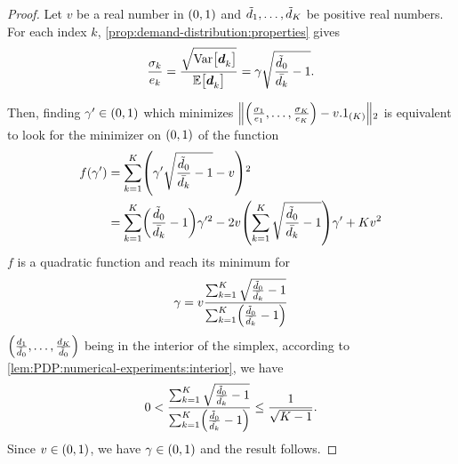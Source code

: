 \begin{proof}
Let $v$ be a real number in $\bracket{0,1}$ and $\tilde{d}_1,\ldots,\tilde{d}_K$ be positive real numbers.
For each index $k$, \cref{prop:demand-distribution:properties} gives
\begin{equation}
  \frac{\sigma_k}{e_k}
  = \frac{\sqrt{\vari\sqbracket{\va\demand_k}}}{\espe\sqbracket{\va\demand_k}}
  = \gamma\sqrt{\frac{\tilde{\demand}_0}{\bar{\demand_k}}-1}.
\end{equation}

Then, finding $\gamma'\in\bracket{0,1}$ which minimizes $\norm{\bracket{\frac{\sigma_1}{e_1},\ldots,\frac{\sigma_K}{e_K}}-v.1_{(K)}}_2$ is equivalent to look for the minimizer on $\bracket{0,1}$ of the function
\begin{subequations}
\begin{align}
  f\bracket{\gamma'}
  &= \sum_{k=1}^K \bracket{\gamma'\sqrt{\frac{\tilde{\demand}_0}{\bar{\demand_k}}-1}-v}^2
  \\
  &= \sum_{k=1}^K\bracket{\frac{\tilde{\demand}_0}{\bar{\demand_k}}-1}\gamma'^2
  - 2v\bracket{\sum_{k=1}^K\sqrt{\frac{\tilde{\demand}_0}{\bar{\demand_k}}-1}}\gamma'
  + K v^2
\end{align}
\end{subequations}
$f$ is a quadratic function and reach its minimum for
\begin{equation}
  \gamma
  =
  v\frac
  {\sum_{k=1}^K\sqrt{\frac{\tilde{\demand}_0}{\bar{\demand_k}}-1}}
  {\sum_{k=1}^K\bracket{\frac{\tilde{\demand}_0}{\bar{\demand_k}}-1}}
\end{equation}
$\bracket{\frac{\demand_1}{\tilde{\demand}_0},\ldots,\frac{\demand_K}{\tilde{\demand}_0}}$ being in the interior of the simplex, according to \cref{lem:PDP:numerical-experiments:interior}, we have
\begin{equation}
  0 <
  \frac
  {\sum_{k=1}^K\sqrt{\frac{\tilde{\demand}_0}{\bar{\demand_k}}-1}}
  {\sum_{k=1}^K\bracket{\frac{\tilde{\demand}_0}{\bar{\demand_k}}-1}}
  \le
  \frac{1}{\sqrt{K-1}}.
\end{equation}
Since $v\in\bracket{0,1}$, we have $\gamma\in\bracket{0,1}$ and the result follows.
\end{proof}



